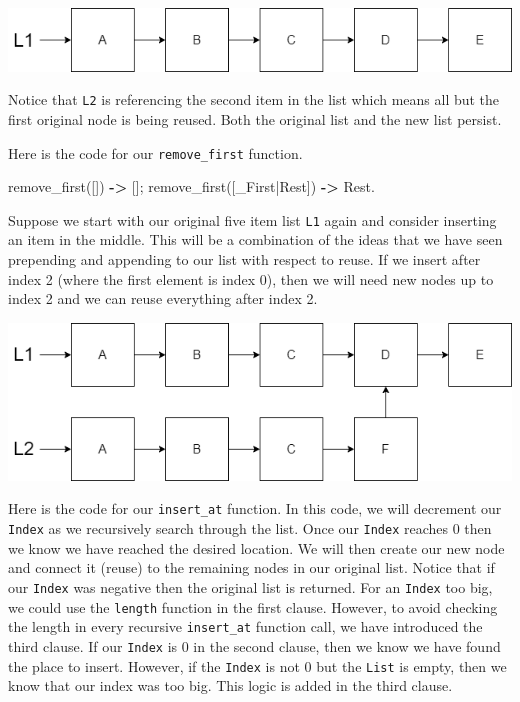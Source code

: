 \documentclass[
]{book}
\newenvironment{Shaded}{\begin{snugshade}}{\end{snugshade}}
\newcommand{\FunctionTok}[1]{\textcolor[rgb]{0.00,0.00,0.00}{#1}}
\newcommand{\OperatorTok}[1]{\textcolor[rgb]{0.81,0.36,0.00}{\textbf{#1}}}
\newcommand{\VariableTok}[1]{\textcolor[rgb]{0.00,0.00,0.00}{#1}}
\begin{document}
\includegraphics{images/FiveElementList.drawio.png}

Notice that \texttt{L2} is referencing the second item in the list which means all but the first original node is being reused. Both the original list and the new list persist.

Here is the code for our \texttt{remove\_first} function.

\begin{Shaded}
\begin{Highlighting}[]
\FunctionTok{remove\_first([])} \OperatorTok{{-}\textgreater{}} \FunctionTok{[];}
\FunctionTok{remove\_first([}\VariableTok{\_First}\FunctionTok{|}\VariableTok{Rest}\FunctionTok{])} \OperatorTok{{-}\textgreater{}} \VariableTok{Rest}\FunctionTok{.}
\end{Highlighting}
\end{Shaded}

Suppose we start with our original five item list \texttt{L1} again and consider inserting an item in the middle. This will be a combination of the ideas that we have seen prepending and appending to our list with respect to reuse. If we insert after index 2 (where the first element is index 0), then we will need new nodes up to index 2 and we can reuse everything after index 2.

\includegraphics{images/FiveElementListInsertAt.drawio.png}

Here is the code for our \texttt{insert\_at} function. In this code, we will decrement our \texttt{Index} as we recursively search through the list. Once our \texttt{Index} reaches 0 then we know we have reached the desired location. We will then create our new node and connect it (reuse) to the remaining nodes in our original list. Notice that if our \texttt{Index} was negative then the original list is returned. For an \texttt{Index} too big, we could use the \texttt{length} function in the first clause. However, to avoid checking the length in every recursive \texttt{insert\_at} function call, we have introduced the third clause. If our \texttt{Index} is 0 in the second clause, then we know we have found the place to insert. However, if the \texttt{Index} is not 0 but the \texttt{List} is empty, then we know that our index was too big. This logic is added in the third clause.
\end{document}
